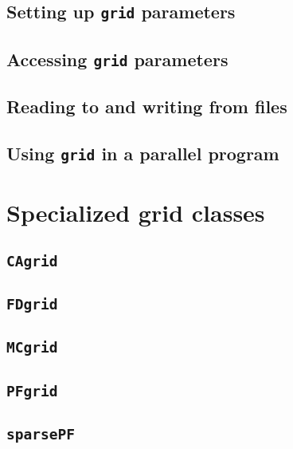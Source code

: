 \subsection{Setting up {\tt grid} parameters}
\subsection{Accessing {\tt grid} parameters}
\subsection{Reading to and writing from files}
\subsection{Using {\tt grid} in a parallel program}


\section{Specialized grid classes}

\subsection{{\tt CAgrid}}

\subsection{{\tt FDgrid}}

\subsection{{\tt MCgrid}}

\subsection{{\tt PFgrid}}

\subsection{{\tt sparsePF}}



